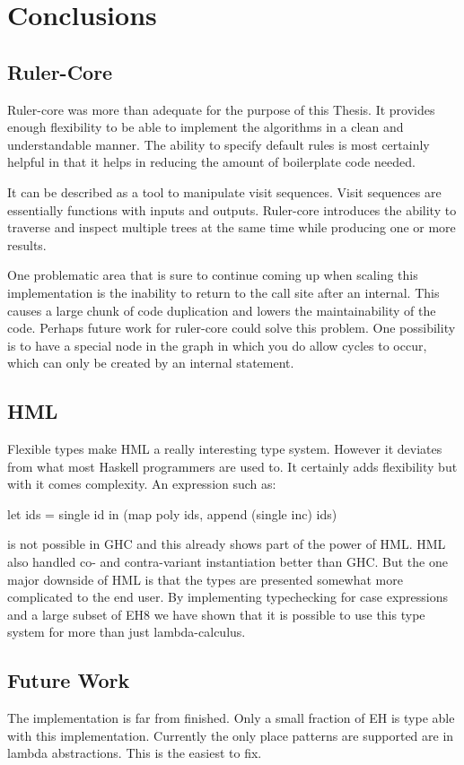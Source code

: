 \chapter{Conclusions}
\section{Ruler-Core}
Ruler-core was more than adequate for the purpose of this Thesis. It provides enough flexibility to be able to implement the algorithms in a clean and understandable manner. The ability to specify default rules is most certainly helpful in that it helps in reducing the amount of boilerplate code needed.

It can be described as a tool to manipulate visit sequences. Visit sequences are essentially functions with inputs and outputs.
Ruler-core introduces the ability to traverse and inspect multiple trees at the same time while producing one or more results. 

One problematic area that is sure to continue coming up when scaling this implementation is the inability to return to the call site after an internal.
This causes a large chunk of code duplication and lowers the maintainability of the code. Perhaps future work for ruler-core could solve this problem. One possibility is to have a special node in the graph in which you do allow cycles to occur, which can only be created by an internal statement.
\section{HML}
Flexible types make HML a really interesting type system. However it deviates from what most Haskell programmers are used to. It certainly adds flexibility but with it comes complexity. 
An expression such as:
\begin{code}
let ids = single id 
in (map poly ids, append (single inc) ids)
\end{code}
is not possible in GHC and this already shows part of the power of HML. HML also handled co- and contra-variant instantiation better than GHC. But the one major downside of HML is that the types are presented somewhat more complicated to the end user. 
By implementing typechecking for case expressions and a large subset of EH8 we have shown that it is possible to use this type system for more than just lambda-calculus. 
\section{Future Work}
The implementation is far from finished. Only a small fraction of EH is type able with this implementation. Currently the only place patterns are supported are in lambda abstractions. This is the easiest to fix.

